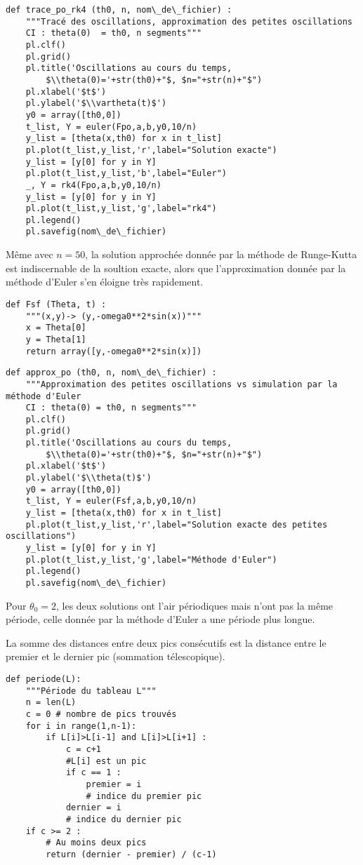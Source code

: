 \question{}
\begin{lstlisting}
def trace_po_rk4 (th0, n, nom\_de\_fichier) :
    """Tracé des oscillations, approximation des petites oscillations
    CI : theta(0)  = th0, n segments"""
    pl.clf()
    pl.grid()
    pl.title('Oscillations au cours du temps, 
        $\\theta(0)='+str(th0)+"$, $n="+str(n)+"$")
    pl.xlabel('$t$')
    pl.ylabel('$\\vartheta(t)$')
    y0 = array([th0,0])
    t_list, Y = euler(Fpo,a,b,y0,10/n)
    y_list = [theta(x,th0) for x in t_list]
    pl.plot(t_list,y_list,'r',label="Solution exacte")
    y_list = [y[0] for y in Y]
    pl.plot(t_list,y_list,'b',label="Euler")
    _, Y = rk4(Fpo,a,b,y0,10/n)
    y_list = [y[0] for y in Y]
    pl.plot(t_list,y_list,'g',label="rk4")
    pl.legend()
    pl.savefig(nom\_de\_fichier)
\end{lstlisting}
Même avec $n=50$, la solution approchée donnée par la méthode de Runge-Kutta est indiscernable de la soultion exacte, alors que l'approximation donnée par la méthode d'Euler s'en éloigne très rapidement. 

\question{}
\begin{lstlisting}
def Fsf (Theta, t) :
    """(x,y)-> (y,-omega0**2*sin(x))"""
    x = Theta[0]
    y = Theta[1]
    return array([y,-omega0**2*sin(x)])
\end{lstlisting}

\question{}
\begin{lstlisting}
def approx_po (th0, n, nom\_de\_fichier) :
    """Approximation des petites oscillations vs simulation par la méthode d'Euler
    CI : theta(0) = th0, n segments"""    
    pl.clf()
    pl.grid()
    pl.title('Oscillations au cours du temps, 
        $\\theta(0)='+str(th0)+"$, $n="+str(n)+"$")
    pl.xlabel('$t$')
    pl.ylabel('$\\theta(t)$')
    y0 = array([th0,0])
    t_list, Y = euler(Fsf,a,b,y0,10/n)
    y_list = [theta(x,th0) for x in t_list]
    pl.plot(t_list,y_list,'r',label="Solution exacte des petites oscillations")
    y_list = [y[0] for y in Y]
    pl.plot(t_list,y_list,'g',label="Méthode d'Euler")
    pl.legend()
    pl.savefig(nom\_de\_fichier)   
\end{lstlisting}
Pour $\theta_0 = 2$, les deux solutions ont l'air périodiques mais n'ont pas la même période, celle donnée par la méthode d'Euler a une période plus longue.

\question{}
La somme des distances entre deux pics consécutifs est la distance entre le premier et le dernier pic (sommation télescopique).
\begin{lstlisting}
def periode(L):
    """Période du tableau L"""
    n = len(L)
    c = 0 # nombre de pics trouvés
    for i in range(1,n-1):
        if L[i]>L[i-1] and L[i]>L[i+1] :
            c = c+1
            #L[i] est un pic
            if c == 1 :
                premier = i
                # indice du premier pic
            dernier = i
            # indice du dernier pic
    if c >= 2 :
        # Au moins deux pics
        return (dernier - premier) / (c-1)
\end{lstlisting}

